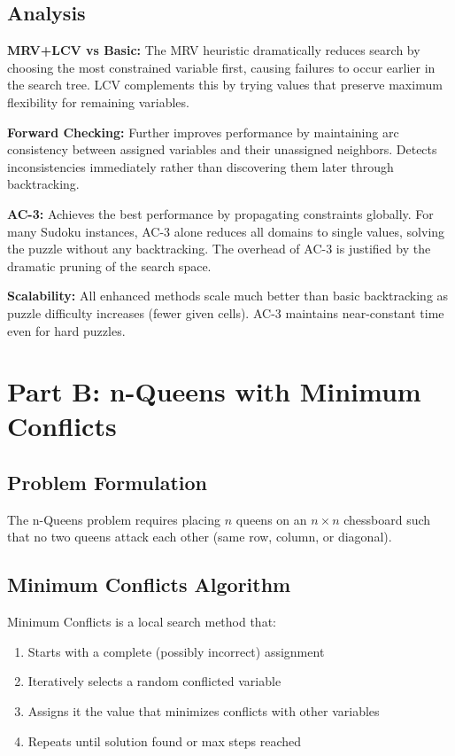 \documentclass[letterpaper]{article}
\begin{document}
\subsection{Analysis}


\textbf{MRV+LCV vs Basic:} The MRV heuristic dramatically reduces search by choosing the most constrained variable first, causing failures to occur earlier in the search tree. LCV complements this by trying values that preserve maximum flexibility for remaining variables.

\textbf{Forward Checking:} Further improves performance by maintaining arc consistency between assigned variables and their unassigned neighbors. Detects inconsistencies immediately rather than discovering them later through backtracking.

\textbf{AC-3:} Achieves the best performance by propagating constraints globally. For many Sudoku instances, AC-3 alone reduces all domains to single values, solving the puzzle without any backtracking. The overhead of AC-3 is justified by the dramatic pruning of the search space.

\textbf{Scalability:} All enhanced methods scale much better than basic backtracking as puzzle difficulty increases (fewer given cells). AC-3 maintains near-constant time even for hard puzzles.

\section{Part B: n-Queens with Minimum Conflicts}

\subsection{Problem Formulation}

The n-Queens problem requires placing $n$ queens on an $n \times n$ chessboard such that no two queens attack each other (same row, column, or diagonal).

\subsection{Minimum Conflicts Algorithm}

Minimum Conflicts is a local search method that:
\begin{enumerate}
\item Starts with a complete (possibly incorrect) assignment
\item Iteratively selects a random conflicted variable
\item Assigns it the value that minimizes conflicts with other variables
\item Repeats until solution found or max steps reached
\end{enumerate}
\end{document}
